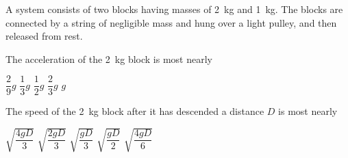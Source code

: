 \documentclass{../../../oss-ap12ibhl-print}
\begin{document}
\begin{questions}
{    A system consists of two blocks having masses of \SI{2}{\kilo\gram} and
    \SI{1}{\kilo\gram}. The blocks are connected by a string of negligible mass
    and hung over a light pulley, and then released from rest.
    \begin{center}
    \end{center}
  }

  \question The acceleration of the \SI{2}{\kilo\gram} block is most nearly
  \begin{choices}
    \choice $\dfrac29g$
    \choice $\dfrac13g$
    \choice $\dfrac12g$
    \choice $\dfrac23g$
    \choice $g$
  \end{choices}
  \label{q:pulley1}
    
  \question The speed of the \SI{2}{\kilo\gram} block after it has descended a
  distance $D$ is most nearly
  \begin{choices}
    \choice $\sqrt{\dfrac{4gD}{3}}$
    \choice $\sqrt{\dfrac{2gD}{3}}$
    \choice $\sqrt{\dfrac{gD}{3}}$
    \choice $\sqrt{\dfrac{gD}{2}}$
    \choice $\sqrt{\dfrac{4gD}{6}}$
  \end{choices}
  \label{q:pulley2}

%
%  
%    


\end{questions}
\end{document}
